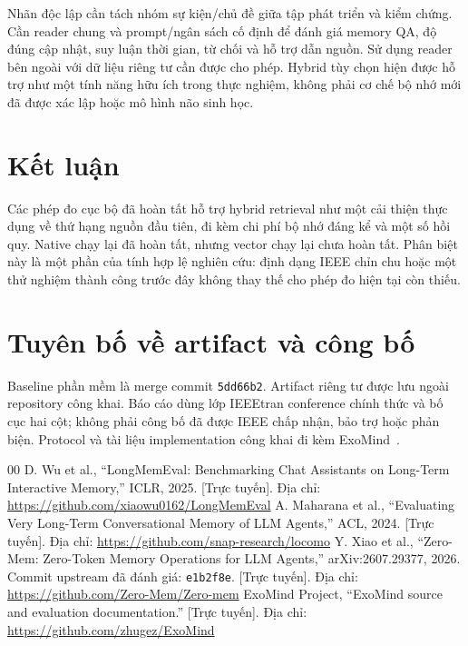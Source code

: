 \documentclass[conference]{IEEEtran}
\begin{document}
Nhãn độc lập cần tách nhóm sự kiện/chủ đề giữa tập phát triển và kiểm chứng. Cần reader chung và prompt/ngân sách cố định để đánh giá memory QA, độ đúng cập nhật, suy luận thời gian, từ chối và hỗ trợ dẫn nguồn. Sử dụng reader bên ngoài với dữ liệu riêng tư cần được cho phép. Hybrid tùy chọn hiện được hỗ trợ như một tính năng hữu ích trong thực nghiệm, không phải cơ chế bộ nhớ mới đã được xác lập hoặc mô hình não sinh học.

\section{Kết luận}
Các phép đo cục bộ đã hoàn tất hỗ trợ hybrid retrieval như một cải thiện thực dụng về thứ hạng nguồn đầu tiên, đi kèm chi phí bộ nhớ đáng kể và một số hồi quy. Native chạy lại đã hoàn tất, nhưng vector chạy lại chưa hoàn tất. Phân biệt này là một phần của tính hợp lệ nghiên cứu: định dạng IEEE chỉn chu hoặc một thử nghiệm thành công trước đây không thay thế cho phép đo hiện tại còn thiếu.

\section*{Tuyên bố về artifact và công bố}
Baseline phần mềm là merge commit \texttt{5dd66b2}. Artifact riêng tư được lưu ngoài repository công khai. Báo cáo dùng lớp IEEEtran conference chính thức và bố cục hai cột; không phải công bố đã được IEEE chấp nhận, bảo trợ hoặc phản biện. Protocol và tài liệu implementation công khai đi kèm ExoMind~\cite{exom}.

\begin{thebibliography}{00}
 D. Wu et al., ``LongMemEval: Benchmarking Chat Assistants on Long-Term Interactive Memory,'' ICLR, 2025. [Trực tuyến]. Địa chỉ: \url{https://github.com/xiaowu0162/LongMemEval}
 A. Maharana et al., ``Evaluating Very Long-Term Conversational Memory of LLM Agents,'' ACL, 2024. [Trực tuyến]. Địa chỉ: \url{https://github.com/snap-research/locomo}
 Y. Xiao et al., ``Zero-Mem: Zero-Token Memory Operations for LLM Agents,'' arXiv:2607.29377, 2026. Commit upstream đã đánh giá: \texttt{e1b2f8e}. [Trực tuyến]. Địa chỉ: \url{https://github.com/Zero-Mem/Zero-mem}
 ExoMind Project, ``ExoMind source and evaluation documentation.'' [Trực tuyến]. Địa chỉ: \url{https://github.com/zhugez/ExoMind}
\end{thebibliography}
\end{document}

